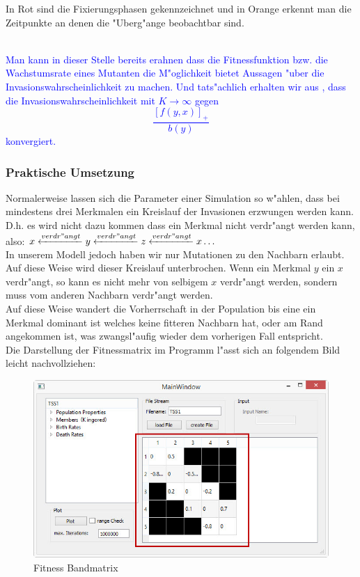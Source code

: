 \documentclass[11pt, a4paper, german]{article}
\theoremstyle{plain}
\begin{document}
	\begin{minipage}{0.3 \textwidth}
		In Rot sind die Fixierungsphasen gekennzeichnet und in Orange erkennt man die Zeitpunkte an denen die "Uberg"ange beobachtbar sind.
	\end{minipage}\\
	
	\textcolor{blue}{Man kann in dieser Stelle bereits erahnen dass die Fitnessfunktion bzw. die Wachstumsrate eines Mutanten die M"oglichkeit bietet Aussagen "uber die Invasionswahrscheinlichkeit zu machen. Und tats"achlich erhalten wir aus \cite{Champagnat20061127}, dass die Invasionswahrscheinlichkeit mit $ K \to \infty $ gegen
	\[ \frac{\left[ f(y,x)\right]_+ }{b(y)} \]
	konvergiert.} 
	
	\subsubsection{Praktische Umsetzung}
	Normalerweise lassen sich die Parameter einer Simulation so w"ahlen, dass bei mindestens drei Merkmalen ein Kreislauf der Invasionen erzwungen werden kann. D.h. es wird nicht dazu kommen dass ein Merkmal nicht verdr"angt werden kann, also: $ x \xleftarrow{verdr"angt} y \xleftarrow{verdr"angt} z \xleftarrow{verdr"angt} x \dots $\\
	In unserem Modell jedoch haben wir nur Mutationen zu den Nachbarn erlaubt. Auf diese Weise wird dieser Kreislauf unterbrochen. Wenn ein Merkmal $ y $ ein $ x $ verdr"angt, so kann es nicht mehr von selbigem $ x $ verdr"angt werden, sondern muss vom anderen Nachbarn verdr"angt werden.\\
	Auf diese Weise wandert die Vorherrschaft in der Population bis eine ein Merkmal dominant ist welches keine fitteren Nachbarn hat, oder am Rand angekommen ist, was zwangsl"aufig wieder dem vorherigen Fall entspricht.\\
	Die Darstellung der Fitnessmatrix im Programm l"asst sich an folgendem Bild leicht nachvollziehen:
	\begin{figure}[H]
		\centering
		\includegraphics[width=1\linewidth]{./Pictures/MainWindow_BandMatrix}
		\caption[Fitness Matrix]{Fitness Bandmatrix}
		\label{MainWindow mit Fitness Bandmatrix}
	\end{figure}
\end{document}
